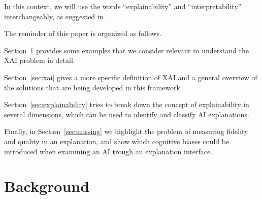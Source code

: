 \documentclass[conference]{IEEEtran}
\newcommand{\cit}[1][]{\todo[tickmarkheight=0.2cm]{cit #1}}
\begin{document}
In this context, we will use  the words “explainability” and “interpretability”
interchangeably, as suggested in \cit.

The reminder of this paper is organized as follows.

Section~\ref{sec:background} provides some examples that we consider relevant to understand the XAI problem in detail.

Section~\ref{sec:xai} gives a more specific definition of XAI and a general
overview of the solutions that are being developed in this framework.

Section~\ref{sec:explainability} tries to break down the concept of explainability in several dimensions, which can be used to identify and classify AI explanations.

Finally, in Section~\ref{sec:missing} we highlight the problem of measuring fidelity and quality in an explanation, and show which cognitive biases could be introduced when examining an AI trough an explanation interface.

\section{Background}
\label{sec:background}





\end{document}

